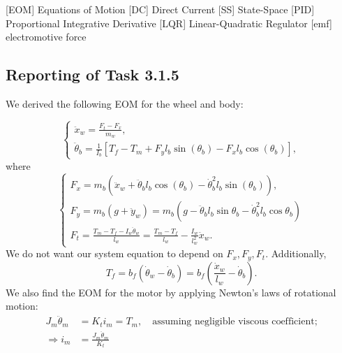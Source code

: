 \documentclass[11pt]{article} %
\begin{document}
\begin{acronym}[TDMA]
		[EOM]	{Equations of Motion}
		[DC]	{Direct Current}
		[SS]	{State-Space}
		[PID]	{Proportional Integrative Derivative}
		[LQR]	{Linear-Quadratic Regulator}
		[emf]	{electromotive force}
\end{acronym}

\subsection*{Reporting of Task 3.1.5}
We derived the following \ac{EOM} for the wheel and body:

\begin{equation}\label{eq:system-init}
  \begin{cases}
    \ddot{x}_w = \frac{F_t - F_x}{m_w}, \\[1em]
    \ddot{\theta}_b =
    \frac{1}{I_b}\left[
      T_f
      - T_m
      + F_y l_b \sin(\theta_b)
      - F_x l_b \cos(\theta_b)
    \right],
  \end{cases}
\end{equation}
where
\begin{equation}\label{eq:F_xyt}
  \begin{cases}
    F_x = m_b\left(
      \ddot{x}_w
      + \ddot{\theta}_b l_b \cos(\theta_b)
      - \dot{\theta}^2_b l_b \sin(\theta_b)
    \right), \\[1em]
    F_y = m_b (g + \ddot{y}_w)
    = m_b (g - \ddot{\theta}_b l_b \sin\theta_b - \dot{\theta}^2_b l_b \cos\theta_b)
    \\[1em]
    F_t = \frac{T_m - T_f - I_w \ddot{\theta}_w}{l_w} = \frac{T_m - T_f}{l_w} - \frac{I_w}{l^2_w} \ddot{x}_w.
  \end{cases}
\end{equation}
We do not want our system equation to depend on $F_x, F_y, F_t$.
Additionally,
\begin{equation}\label{eq:T_f}
T_f = b_f\left(
\dot{\theta}_w - \dot{\theta}_b
\right) =
b_f\left(
\frac{\dot{x}_w}{l_w} - \dot{\theta}_b
\right).
\end{equation}
We also find the \ac{EOM} for the motor by applying Newton's laws of rotational motion:
\begin{align}
  J_m \ddot{\theta}_m &= K_t i_m = T_m, \quad \text{assuming negligible viscous coefficient;}\nonumber \\
  \Rightarrow i_m &= \frac{J_m \ddot{\theta}_m}{K_t}\label{eq:motor/newton}
\end{align}
\end{document}
